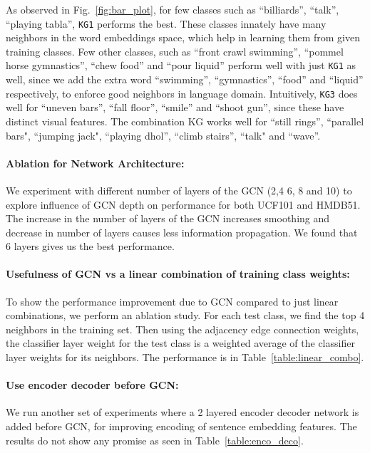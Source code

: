 As observed in Fig.~\ref{fig:bar_plot}, for few classes such as ``billiards'', ``talk'', ``playing tabla'', \texttt{KG1} performs the best. These classes innately have many neighbors in the word embeddings space, which help in learning them from given training classes. Few other classes, such as ``front crawl swimming'', ``pommel horse gymnastics'', ``chew food'' and ``pour liquid'' perform well with just \texttt{KG1} as well, since we add the extra word ``swimming'', ``gymnastics'', ``food'' and ``liquid'' respectively, to enforce good neighbors in language domain. Intuitively, \texttt{KG3} does well for ``uneven bars'', ``fall floor'', ``smile'' and ``shoot gun'', since these have distinct visual features. The combination KG works well for ``still rings'', ``parallel bars", ``jumping jack", ``playing dhol'', ``climb stairs'', ``talk" and ``wave''.















\paragraph{\bf Ablation for Network Architecture:}

We experiment with different number of layers of the GCN (2,4 6, 8 and 10) to explore influence of GCN depth on performance for both UCF101 and HMDB51. The increase in the number of layers of the GCN increases smoothing and decrease in number of layers causes less information propagation. We found that 6 layers gives us the best performance. 

\paragraph{Usefulness of GCN vs a linear combination of training class weights:}
To show the performance improvement due to GCN compared to just linear combinations, we perform an ablation study.  For each test class, we find the top 4 neighbors in the training set. Then using the adjacency edge connection weights, the classifier layer weight for the test class is a weighted average of the classifier layer weights for its neighbors. The performance is in Table~\ref{table:linear_combo}.

\paragraph{Use encoder decoder before GCN:}
We run another set of experiments where a 2 layered encoder decoder network is added before GCN, for improving encoding of sentence embedding features. The results do not show any promise as seen in Table~\ref{table:enco_deco}.

